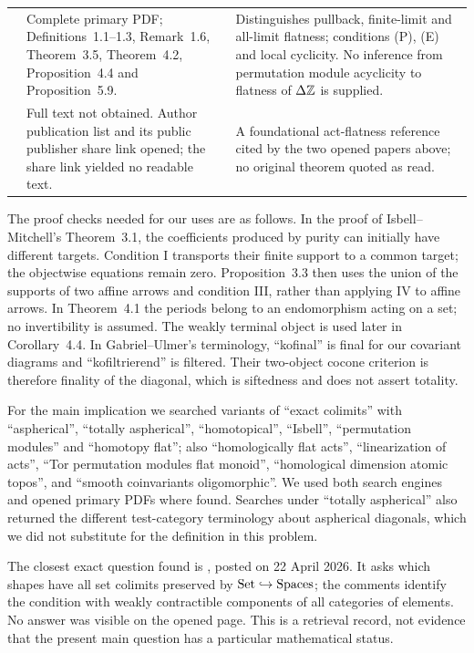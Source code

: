 \begin{longtable}{@{}p{}p{}p{}@{}}
\citet{LaanEtAl2021}
& Complete primary PDF; Definitions~1.1--1.3, Remark~1.6,
Theorem~3.5, Theorem~4.2, Proposition~4.4 and Proposition~5.9.
& Distinguishes pullback, finite-limit and all-limit flatness;
conditions (P), (E) and local cyclicity. No inference from permutation
module acyclicity to flatness of $\Delta\mathbb Z$ is supplied. \\

\citet{BulmanFlemingLaan2001}
& Full text not obtained. Author publication list and its public
publisher share link opened; the share link yielded no readable text.
& A foundational act-flatness reference cited by the two opened
papers above; no original theorem quoted as read. \\
\end{longtable}
\endgroup

The proof checks needed for our uses are as follows. In the proof of
Isbell--Mitchell's Theorem~3.1, the coefficients produced by purity can
initially have different targets. Condition I transports their finite
support to a common target; the objectwise equations remain zero.
Proposition~3.3 then uses the union of the supports of two affine arrows
and condition III, rather than applying IV to affine arrows. In
Theorem~4.1 the periods belong to an endomorphism acting on a set; no
invertibility is assumed. The weakly terminal object is used later in
Corollary~4.4. In Gabriel--Ulmer's terminology, ``kofinal'' is final
for our covariant diagrams and ``kofiltrierend'' is filtered. Their
two-object cocone criterion is therefore finality of the diagonal,
which is siftedness and does not assert totality.

For the main implication we searched variants of ``exact colimits'' with
``aspherical'', ``totally aspherical'', ``homotopical'', ``Isbell'',
``permutation modules'' and ``homotopy flat''; also ``homologically flat
acts'', ``linearization of acts'', ``Tor permutation modules flat monoid'',
``homological dimension atomic topos'', and ``smooth coinvariants
oligomorphic''. We used both search engines and opened primary PDFs where
found. Searches under ``totally aspherical'' also returned the different
test-category terminology about aspherical diagonals, which we did not
substitute for the definition in this problem.

The closest exact question found is \citet{Henry2026}, posted on
22 April 2026. It asks which shapes have all set colimits preserved by
$\mathrm{Set}\hookrightarrow\mathrm{Spaces}$; the comments identify the condition
with weakly contractible components of all categories of elements. No
answer was visible on the opened page. This is a retrieval record, not
evidence that the present main question has a particular mathematical
status.

